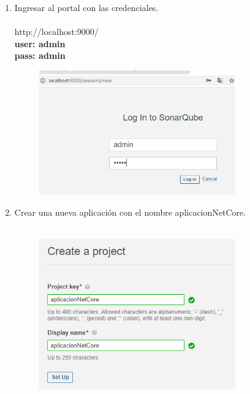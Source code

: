 \documentclass{report}
\begin{document}
\begin{enumerate}
		\item {\large Ingresar al portal con las credenciales.}\\\\
		http://localhost:9000/ \\
		
		\textbf{user: admin}\\
		\textbf{pass: admin}\\
		
		\begin{figure}[htb]
			\centering
			\includegraphics[width=0.8\textwidth]{img/login.png}
			\label{fig:login}
		\end{figure}
		
		
		\item {\large Crear una nueva aplicación con el nombre aplicacionNetCore.}\\\\
		
		\begin{figure}[htb]
			\centering
			\includegraphics[width=0.8\textwidth]{img/crearproyecto.png}
			\label{fig:crearproyecto}
		\end{figure}
		

\end{enumerate}
\end{document}
